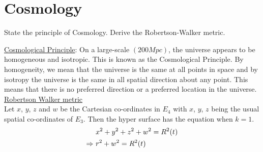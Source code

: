 \documentclass[../main-sheet.tex]{subfiles}
\begin{document}
\chapter{Cosmology}
\begin{prob}
    State the principle of Cosmology. Derive the Robertson-Walker metric.
\end{prob}
\begin{soln}
    \underline{Cosmological Principle}: On a large-scale \(( 200Mpc)\), the universe appears to be homogeneous and
    isotropic. This is known as the Cosmological Principle. By homogeneity, we mean
    that the universe is the same at all points in space and by isotropy the universe is
    the same in all spatial direction about any point. This means that there is no
    preferred direction or a preferred location in the universe.\\


    \underline{Robertson Walker metric}\\
    Let \(x\), \(y\), \(z\) and \(w\) be the Cartesian co-ordinates in \(E_4\) with \(x\), \(y\), \(z\) being the usual spatial co-ordinates of \(E_3\). Then the hyper surface has the equation when \(k = 1\).
    \begin{align}
        &x^2 + y^2 + z^2 + w^2 = R^2(t)\notag\\
        \Rightarrow\,\,&r^2 + w^2 = R^2(t)\label{eq:robert1}
    \end{align}
 

\end{soln}
\end{document}
